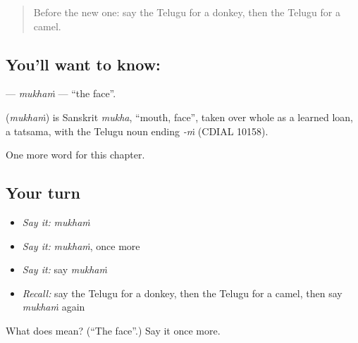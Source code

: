 \label{lesson:TE-C126-mukham}



\begin{quote}
Before the new one: say the Telugu for a donkey, then the Telugu for a camel.
\end{quote}

\subsection*{You'll want to know: }
\textbf{} — \emph{mukhaṁ} — \textquotedblleft{}the face\textquotedblright{}.

\begin{cousinweb}
\textbf{} (\emph{mukhaṁ}) is Sanskrit \emph{mukha}, \textquotedblleft{}mouth, face\textquotedblright{}, taken over whole as a learned loan, a tatsama, with the Telugu noun ending \emph{-ṁ} (CDIAL 10158).
\end{cousinweb}

\begin{grammarlens}[title={What you've built}]
One more word for this chapter.
\end{grammarlens}

\subsection*{Your turn}
\begin{itemize}
\raggedright
  \item \emph{Say it:} \emph{mukhaṁ}
  \item \emph{Say it:} \emph{mukhaṁ}, once more
  \item \emph{Say it:} say \emph{mukhaṁ}
  \item \emph{Recall:} say the Telugu for a donkey, then the Telugu for a camel, then say \emph{mukhaṁ} again
\end{itemize}

\begin{tcolorbox}[breakable,colback=teal!4,colframe=teal!35!black,title={Before you move on}]
What does  mean? (\textquotedblleft{}The face\textquotedblright{}.) Say it once more.
\end{tcolorbox}
